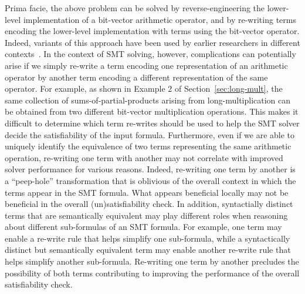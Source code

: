 \vspace{0.2 cm}
Prima facie, the above problem can be solved by reverse-engineering
the lower-level implementation of a bit-vector arithmetic operator,
and by re-writing terms encoding the lower-level implementation with
terms using the bit-vector operator.  Indeed, variants of this
approach have been used by earlier researchers in different
contexts~\cite{kunz,ciesielski,kolbl,reveng,earlier-pat-match-synopsys}.
In the context of SMT solving, however, complications can potentially
arise if we simply re-write a term encoding one representation of an
arithmetic operator by another term encoding a different
representation of the same operator. For example, as shown in Example
$2$ of Section~\ref{sec:long-mult}, the same collection of
sums-of-partial-products arising from long-multiplication can be
obtained from two different bit-vector multiplication operations.
This makes it difficult to determine which term re-writes should be
used to help the SMT solver decide the satisfiability of the input
formula.  Furthermore, even if we are able to uniquely identify the
equivalence of two terms representing the same arithmetic operation,
re-writing one term with another may not correlate with improved solver
performance for various reasons.  Indeed, re-writing one term by
another is a ``peep-hole'' transformation that is oblivious of the
overall context in which the terms appear in the SMT formula.  What
appears beneficial locally may not be beneficial in the overall
(un)satisfiability check.  In addition, syntactially distinct terms
that are semantically equivalent may play different roles when
reasoning about different sub-formulas of an SMT formula.  For
example, one term may enable a re-write rule that helps simplify one
sub-formula, while a syntactically distinct but semantically
equivalent term may enable another re-write rule that helps simplify
another sub-formula. Re-writing one term by another precludes the
possibility of both terms contributing to improving the performance of
the overall satisfiability check.

